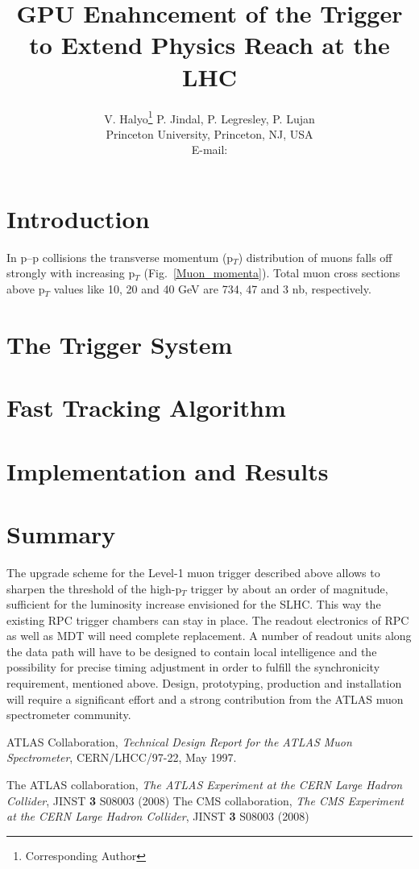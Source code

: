 \documentclass{JINST}
\title{GPU Enahncement of the Trigger to Extend Physics Reach at the LHC}
\author{V. Halyo\thanks{Corresponding Author} P. Jindal, P. Legresley, P. Lujan \\
\llap Princeton University, Princeton, NJ, USA \\
E-mail: \email{vhalyo@gmail.com}}
\begin{document}
% 
% 
\section{Introduction} 
% 
In p--p collisions the transverse 
momentum (p$_T$) distribution of muons falls off strongly with increasing p$_T$ 
(Fig.~\ref{Muon_momenta}). Total muon cross sections above p$_T$ values like 10, 20 and 40 
GeV are 734, 47 and 3 nb, respectively. 
% 

\section{The Trigger System}
%

\section{Fast Tracking Algorithm}


\section{Implementation and Results}

%
\section{Summary}
%
The upgrade scheme for the Level-1 muon trigger described above allows to sharpen the threshold of
the  high-p$_T$ trigger by about an order of magnitude, sufficient for the luminosity increase
envisioned  for the SLHC. This way the existing RPC trigger chambers can stay in place. The readout
electronics of  RPC as well as MDT will need complete replacement. A number of readout units along
the data path will  have to be designed to contain local intelligence and the possibility for
precise timing adjustment in  order to fulfill the synchronicity requirement, mentioned above.
Design, prototyping, production and  installation will require a significant effort and a strong
contribution from the ATLAS muon  spectrometer community. 


\begin{thebibliography}{9}

ATLAS Collaboration,
\textsl{Technical Design Report for the ATLAS Muon Spectrometer},
CERN/LHCC/97-22, May 1997.


The ATLAS collaboration,
\emph{The ATLAS Experiment at the CERN Large Hadron Collider},
JINST {\textbf 3}  S08003 (2008)
%
The CMS collaboration,
\emph{The CMS Experiment at the CERN Large Hadron Collider},
JINST {\textbf 3}  S08003 (2008)
%


\end{thebibliography}
\end{document}
